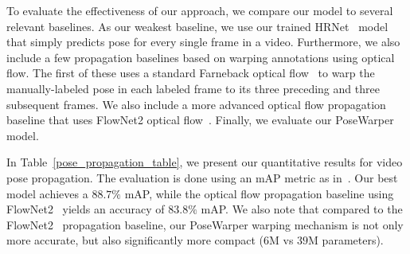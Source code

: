 \documentclass{article}
\begin{document}
To evaluate the effectiveness of our approach, we compare our model to several relevant baselines. As our weakest baseline, we use our trained HRNet~\cite{sun2019deep} model that simply predicts pose for every single frame in a video. Furthermore, we also include a few propagation baselines based on warping annotations using optical flow. The first of these uses a standard Farneback optical flow~\cite{Farneback:2003:TME:1763974.1764031} to warp the manually-labeled pose in each labeled frame to its three preceding and three subsequent frames. We also include a more advanced optical flow propagation baseline that uses FlowNet2 optical flow~\cite{DBLP:journals/corr/IlgMSKDB16}. Finally, we evaluate our PoseWarper model. 









In Table~\ref{pose_propagation_table}, we present our quantitative results for video pose propagation. The evaluation is done using an mAP metric as in~\cite{insafutdinov2016deepercut}. Our best model achieves a $88.7\%$ mAP, while the optical flow propagation baseline using FlowNet2~\cite{DBLP:journals/corr/IlgMSKDB16} yields an accuracy of $83.8\%$ mAP.  We also note that compared to the FlowNet2~\cite{DBLP:journals/corr/IlgMSKDB16} propagation baseline, our PoseWarper warping mechanism is not only more accurate, but also significantly more compact ($6$M vs $39$M parameters).
\end{document}

